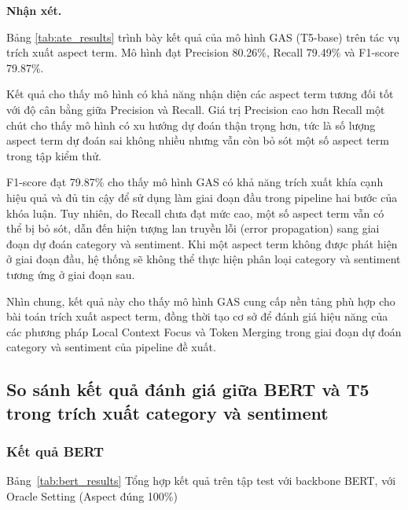 \textbf{Nhận xét.}

Bảng \ref{tab:ate_results} trình bày kết quả của mô hình GAS (T5-base) trên tác vụ trích xuất aspect term. Mô hình đạt Precision 80.26\%, Recall 79.49\% và F1-score 79.87\%.

Kết quả cho thấy mô hình có khả năng nhận diện các aspect term tương đối tốt với độ cân bằng giữa Precision và Recall. Giá trị Precision cao hơn Recall một chút cho thấy mô hình có xu hướng dự đoán thận trọng hơn, tức là số lượng aspect term dự đoán sai không nhiều nhưng vẫn còn bỏ sót một số aspect term trong tập kiểm thử.

F1-score đạt 79.87\% cho thấy mô hình GAS có khả năng trích xuất khía cạnh hiệu quả và đủ tin cậy để sử dụng làm giai đoạn đầu trong pipeline hai bước của khóa luận. Tuy nhiên, do Recall chưa đạt mức cao, một số aspect term vẫn có thể bị bỏ sót, dẫn đến hiện tượng lan truyền lỗi (error propagation) sang giai đoạn dự đoán category và sentiment. Khi một aspect term không được phát hiện ở giai đoạn đầu, hệ thống sẽ không thể thực hiện phân loại category và sentiment tương ứng ở giai đoạn sau.

Nhìn chung, kết quả này cho thấy mô hình GAS cung cấp nền tảng phù hợp cho bài toán trích xuất aspect term, đồng thời tạo cơ sở để đánh giá hiệu năng của các phương pháp Local Context Focus và Token Merging trong giai đoạn dự đoán category và sentiment của pipeline đề xuất.


\subsection{So sánh kết quả đánh giá giữa BERT và T5 trong trích xuất category và sentiment}
\subsubsection*{Kết quả BERT}
Bảng~\ref{tab:bert_results} Tổng hợp kết quả trên tập test với backbone BERT, với Oracle Setting (Aspect đúng 100\%)

